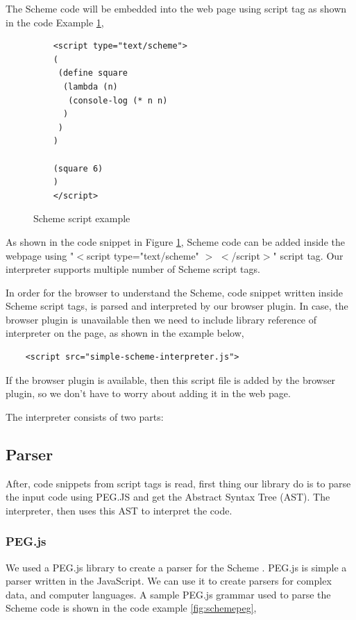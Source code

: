 The Scheme code will be embedded into the web page using script tag as shown in the code Example \ref{fig:schemescript}, 

\begin{figure}[h]
	\begin{lstlisting} 
	<script type="text/scheme">
	(
	 (define square
	  (lambda (n) 
	   (console-log (* n n)
	  ) 
	 )
	)
		
	(square 6)
	)
	</script>
	\end{lstlisting}
	\caption{Scheme script example}
	\label{fig:schemescript}
\end{figure}



As shown in the code snippet in Figure \ref{fig:schemescript}, Scheme code can be added inside the webpage using "$<$script type="text/scheme" $>$ $<$/script$>$" script tag. Our interpreter supports multiple number of Scheme script tags.

In order for the browser to understand the Scheme, code snippet written inside Scheme script tags, is parsed and interpreted by our browser plugin. In case, the browser plugin is unavailable then we need to include library reference of interpreter on the page, as shown in the example below, 

\begin{lstlisting}
	<script src="simple-scheme-interpreter.js">
\end{lstlisting}

If the browser plugin is available, then this script file is added by the browser plugin, so we don't have to worry about adding it in the web page.

The interpreter consists of two parts:

\subsection{Parser}

After, code snippets from script tags is read, first thing our library do is to parse the input code using PEG.JS and get the Abstract Syntax Tree (AST). The interpreter, then uses this AST to interpret the code.

\subsubsection{PEG.js}

We used a PEG.js library to create a parser for the Scheme \cite{pegjs}. PEG.js is simple a parser written in the JavaScript. We can use it to create parsers for complex data, and computer languages. A sample PEG.js grammar used to parse the Scheme code is shown in the code example \ref{fig:schemepeg},


